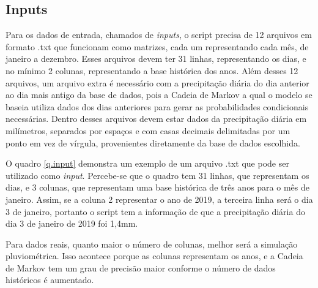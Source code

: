 \subsection{Inputs}
\label{ss.inputs}
Para os dados de entrada, chamados de \emph{inputs}, o script precisa de 12 arquivos em formato .txt que funcionam como matrizes, cada um representando cada mês, de janeiro a dezembro. Esses arquivos devem ter 31 linhas, representando os dias, e no mínimo 2 colunas, representando a base histórica dos anos. Além desses 12 arquivos, um arquivo extra é necessário com a precipitação diária do dia anterior ao dia mais antigo da base de dados, pois a Cadeia de Markov a qual o modelo se baseia utiliza dados dos dias anteriores para gerar as probabilidades condicionais necessárias. Dentro desses arquivos devem estar dados da precipitação diária em milímetros, separados por espaços e com casas decimais delimitadas por um ponto em vez de vírgula, provenientes diretamente da base de dados escolhida. 

O quadro \ref{q.input} demonstra um exemplo de um arquivo .txt que pode ser utilizado como \emph{input}. Percebe-se que o quadro tem 31 linhas, que representam os dias, e 3 colunas, que representam uma base histórica de três anos para o mês de janeiro. Assim, se a coluna 2 representar o ano de 2019, a terceira linha será o dia 3 de janeiro, portanto o script tem a informação de que a precipitação diária do dia 3 de janeiro de 2019 foi 1,4mm.

Para dados reais, quanto maior o número de colunas, melhor será a simulação pluviométrica. Isso acontece porque as colunas representam os anos, e a Cadeia de Markov tem um grau de precisão maior conforme o número de dados históricos é aumentado.

